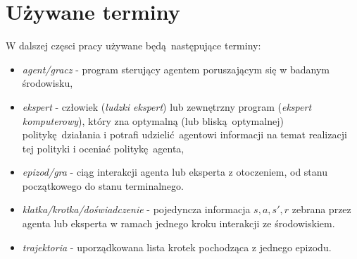 \section{Używane terminy}

W dalszej częsci pracy używane będą następujące terminy:

\begin{itemize}
\item \textit{agent/gracz} - program sterujący agentem poruszającym się w badanym środowisku,
\item \textit{ekspert} - człowiek (\textit{ludzki ekspert}) lub zewnętrzny program (\textit{ekspert komputerowy}), który zna optymalną (lub bliską optymalnej) politykę działania i potrafi udzielić agentowi informacji na temat realizacji tej polityki i oceniać politykę agenta,
\item \textit{epizod/gra} - ciąg interakcji agenta lub eksperta z otoczeniem, od stanu początkowego do stanu terminalnego.
\item \textit{klatka/krotka/doświadczenie} - pojedyncza informacja $s,a,s',r$ zebrana przez agenta lub eksperta w ramach jednego kroku interakcji ze środowiskiem.  
\item \textit{trajektoria} - uporządkowana lista krotek pochodząca z jednego epizodu.
\end{itemize}
